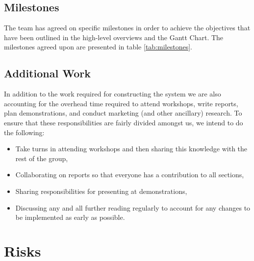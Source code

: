 \documentclass{article}
\begin{document}
\subsection{Milestones}
The team has agreed on specific milestones in order to achieve the objectives that have been outlined in the high-level overviews and the Gantt Chart. The milestones agreed upon are presented in table \ref{tab:milestones}.

\subsection{Additional Work}
In addition to the work required for constructing the system we are also accounting for the overhead time required to attend workshops, write reports, plan demonstrations, and conduct marketing (and other ancillary) research. To ensure that these responsibilities are fairly divided amongst us, we intend to do the following:

\begin{itemize}

\item Take turns in attending workshops and then sharing this knowledge with the rest of the group,
\item Collaborating on reports so that everyone has a contribution to all sections, 
\item Sharing responsibilities for presenting at demonstrations,
\item Discussing any and all further reading regularly to account for any changes to be implemented as early as possible.

\end{itemize}



\section{Risks}

\end{document}
